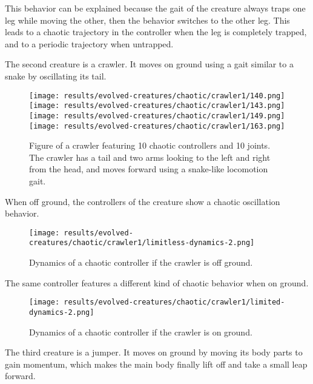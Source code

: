 \documentclass[main]{subfiles}
\begin{document}
This behavior can be explained because the gait of the creature always traps one leg while moving the other, then the behavior switches to the other leg. %
%
This leads to a chaotic trajectory in the controller when the leg is completely trapped, and to a periodic trajectory when untrapped. %

The second creature is a crawler. It moves on ground using a gait similar to a snake by oscillating its tail.

\begin{figure}[H]
\centering
\texttt{[image: results/evolved-creatures/chaotic/crawler1/140.png]}
\texttt{[image: results/evolved-creatures/chaotic/crawler1/143.png]}
\texttt{[image: results/evolved-creatures/chaotic/crawler1/149.png]}
\texttt{[image: results/evolved-creatures/chaotic/crawler1/163.png]}
\caption[Figure of a crawler using chaotic controllers.]{Figure of a crawler featuring 10 chaotic controllers and 10 joints. The crawler has a tail and two arms looking to the left and right from the head, and moves forward using a snake-like locomotion gait.}
\label{figure:successfulcreatures-chaotic-crawler1}
\end{figure}

When off ground, the controllers of the creature show a chaotic oscillation behavior. %

\begin{figure}[H]
\centering
\texttt{[image: results/evolved-creatures/chaotic/crawler1/limitless-dynamics-2.png]}
\caption[Off ground controller dynamics of the crawler]{Dynamics of a chaotic controller if the crawler is off ground.}
\label{figure:crawler1-off-ground-controller-dynamics}
\end{figure}

The same controller features a different kind of chaotic behavior when on ground. %

\begin{figure}[H]
\centering
\texttt{[image: results/evolved-creatures/chaotic/crawler1/limited-dynamics-2.png]}
\caption[On ground controller dynamics of the crawler]{Dynamics of a chaotic controller if the crawler is on ground.}
\label{figure:crawler1-on-ground-controller-dynamics}
\end{figure}

The third creature is a jumper. It moves on ground by moving its body parts to gain momentum, which makes the main body finally lift off and take a small leap forward.
\end{document}
